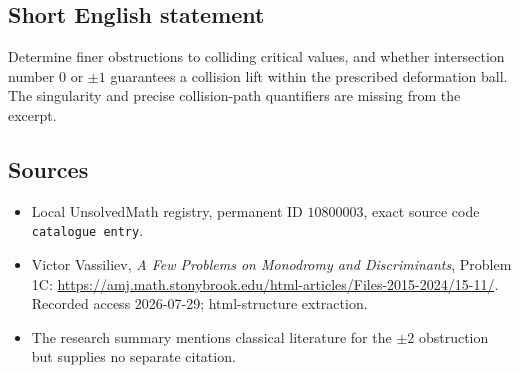 \documentclass[11pt]{article}
\begin{document}
\subsection{Short English statement}
Determine finer obstructions to colliding critical values, and whether intersection number \(0\) or \(\pm1\) guarantees a collision lift within the prescribed deformation ball. The singularity and precise collision-path quantifiers are missing from the excerpt.
\subsection{Sources}
\begin{itemize}
\item Local UnsolvedMath registry, permanent ID \(10800003\), exact source code \texttt{catalogue entry}.
\item Victor Vassiliev, \emph{A Few Problems on Monodromy and Discriminants}, Problem 1C: \url{https://amj.math.stonybrook.edu/html-articles/Files-2015-2024/15-11/}. Recorded access 2026-07-29; html-structure extraction.
\item The research summary mentions classical literature for the \(\pm2\) obstruction but supplies no separate citation.
\end{itemize}
\end{document}
